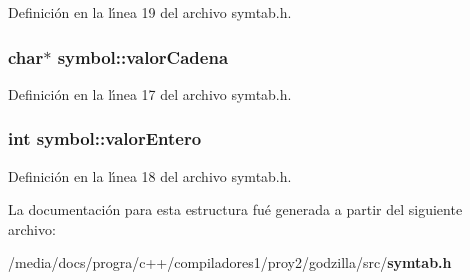 Definici\'{o}n en la l\'{\i}nea 19 del archivo symtab.h.
\subsubsection{\setlength{\rightskip}{0pt plus 5cm}char$\ast$ {\bf symbol::valor\-Cadena}}\label{structsymbol_o2}




Definici\'{o}n en la l\'{\i}nea 17 del archivo symtab.h.
\subsubsection{\setlength{\rightskip}{0pt plus 5cm}int {\bf symbol::valor\-Entero}}\label{structsymbol_o3}




Definici\'{o}n en la l\'{\i}nea 18 del archivo symtab.h.

La documentaci\'{o}n para esta estructura fu\'{e} generada a partir del siguiente archivo:\begin{CompactItemize}
\item 
/media/docs/progra/c++/compiladores1/proy2/godzilla/src/{\bf symtab.h}\end{CompactItemize}
